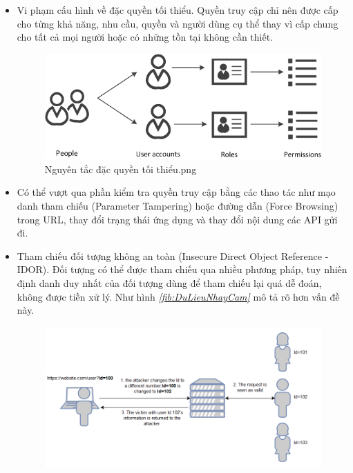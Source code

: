 \begin{itemize}
    \item Vi phạm cấu hình về đặc quyền tối thiểu. Quyền truy cập chỉ nên được cấp cho từng khả năng, nhu cầu, quyền và người dùng cụ thể thay vì cấp chung cho tất cả mọi người hoặc có những tồn tại không cần thiết.
    \begin{figure}[H]
        \centering
        \includegraphics[width=\textwidth]{applied-thesis-chapters/chapter-2/Nguyên tắc đặc quyền tối thiểu.png}
        \caption{Nguyên tắc đặc quyền tối thiểu.png ~\cite{chap2bib2}}
    \end{figure}
    \item Có thể vượt qua phần kiểm tra quyền truy cập bằng các thao tác như mạo danh tham chiếu (Parameter Tampering) hoặc đường dẫn (Force Browsing) trong URL, thay đổi trạng thái ứng dụng và thay đổi nội dung các API gửi đi.
    \item Tham chiếu đối tượng không an toàn (Insecure Direct Object Reference - IDOR). Đối tượng có thể được tham chiếu qua nhiều phương pháp, tuy nhiên định danh duy nhất của đối tượng dùng để tham chiếu lại quá dễ đoán, không được tiền xử lý.
    Như hình \textit{\ref{fib:DuLieuNhayCam} } mô tả rõ hơn vấn đề này.
    \begin{figure}[H]
        \centering
        \includegraphics[width=\textwidth]{applied-thesis-chapters/chapter-2/Mô tả dữ liệu nhạy cảm có thể được tìm thấy trong URL.png}

\end{figure}
\end{itemize}
